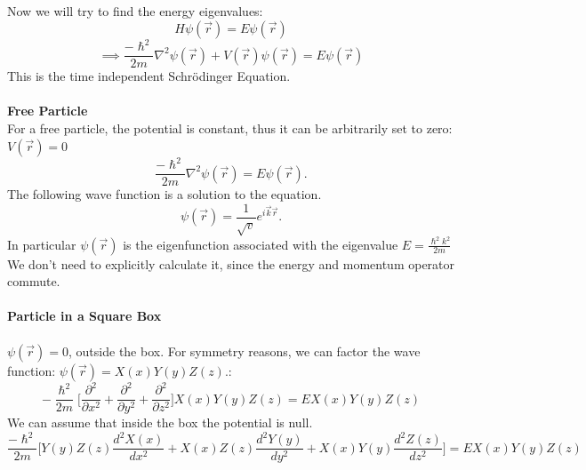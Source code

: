 \documentclass{article}
\begin{document}
Now we will try to find the energy eigenvalues:
$$H \psi(\vec{r}) = E\psi(\vec{r})$$
$$\implies \frac{-\hslash^2}{2m} \nabla^2 \psi(\vec{r}) + V(\vec{r})\psi(\vec{r}) = E\psi(\vec{r})$$
This is the time independent Schrödinger Equation.\\ \\
\textbf{Free Particle} \\
For a free particle, the potential is constant, thus it can be arbitrarily set to zero: $V(\vec{r}) = 0$
$$\frac{-\hslash^2}{2m} \nabla^2 \psi(\vec{r}) = E\psi(\vec{r}).$$
The following wave function is a solution to the equation.
$$\psi(\vec{r}) = \frac{1}{\sqrt{v}}e^{i\vec{k}\vec{r}}.$$
In particular $\psi(\vec{r})$ is the eigenfunction associated with the eigenvalue $E=\frac{\hslash^2k^2}{2m}$
We don't need to explicitly calculate it, since the energy and momentum operator commute.\\ \\ 
\textbf{Particle in a Square Box} \\ \\
$\psi(\vec{r}) =0$, outside the box.
For symmetry reasons, we can factor the wave function: $\psi(\vec{r}) = X(x)Y(y)Z(z).$: 
$$-\frac{\hslash^2}{2m} \biggl[ \frac{\partial^2}{\partial x^2} + \frac{\partial^2}{\partial y^2}+\frac{\partial^2}{\partial z^2} \biggl] X(x)Y(y)Z(z) = EX(x)Y(y)Z(z)$$
We can assume that inside the box the potential is null.
$$\frac{-\hslash^2}{2m} \Biggl[ Y(y)Z(z) \frac{d^2X(x)}{dx^2} + X(x)Z(z) \frac{d^2Y(y)}{dy^2} + X(x)Y(y) \frac{d^2Z(z)}{dz^2} \Biggl]  = EX(x)Y(y)Z(z)$$
\end{document}
